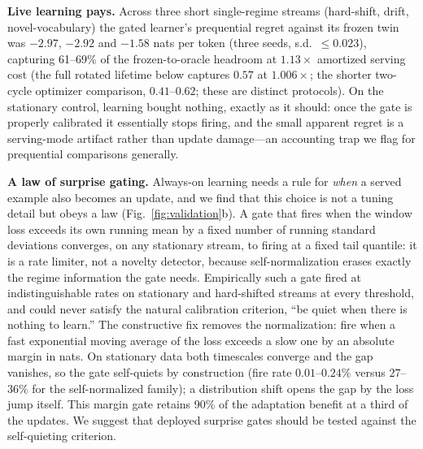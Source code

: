 \documentclass[sn-nature]{sn-jnl}   %
\newcommand{\heading}[1]{\vspace{4pt}\noindent\textbf{#1}\hspace{0.6em}}
\begin{document}
\heading{Live learning pays.}
Across three short single-regime streams (hard-shift, drift, novel-vocabulary)
the gated learner's prequential regret against its frozen twin was $-2.97$,
$-2.92$ and $-1.58$ nats per token (three seeds, s.d.\ $\le0.023$), capturing
61--69\% of the frozen-to-oracle headroom at $1.13\times$ amortized serving cost
(the full rotated lifetime below captures $0.57$ at $1.006\times$; the shorter
two-cycle optimizer comparison, $0.41$--$0.62$; these are distinct protocols). On the
stationary control, learning bought nothing, exactly as it should: once the gate
is properly calibrated it essentially stops firing, and the small apparent
regret is a serving-mode artifact rather than update damage---an accounting trap
we flag for prequential comparisons generally.

\heading{A law of surprise gating.}
Always-on learning needs a rule for \emph{when} a served example also becomes an
update, and we find that this choice is not a tuning detail but obeys a law
(Fig.~\ref{fig:validation}b). A gate that fires when the window loss
exceeds its own running mean by a fixed number of running standard deviations
converges, on any stationary stream, to firing at a fixed tail quantile: it is a
rate limiter, not a novelty detector, because self-normalization erases exactly
the regime information the gate needs. Empirically such a gate fired at
indistinguishable rates on stationary and hard-shifted streams at every
threshold, and could never satisfy the natural calibration criterion, ``be quiet
when there is nothing to learn.'' The constructive fix removes the
normalization: fire when a fast exponential moving average of the loss exceeds a
slow one by an absolute margin in nats. On stationary data both timescales
converge and the gap vanishes, so the gate self-quiets by construction (fire
rate $0.01$--$0.24\%$ versus $27$--$36\%$ for the self-normalized family); a
distribution shift opens the gap by the loss jump itself. This margin gate
retains 90\% of the adaptation benefit at a third of the updates. We suggest
that deployed surprise gates should be tested against the self-quieting
criterion.
\end{document}
